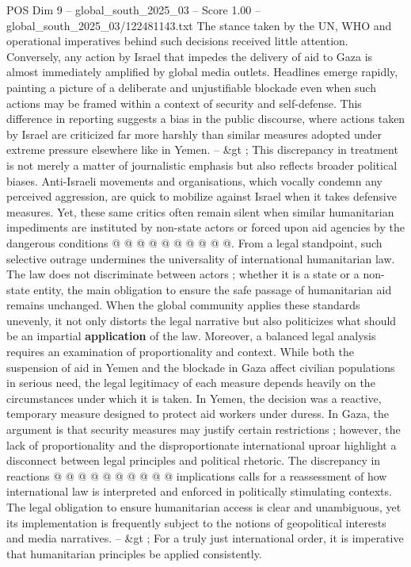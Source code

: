 \begin{textsample}{POS Dim 9 – global\_south\_2025\_03 – Score 1.00 – global\_south\_2025\_03/122481143.txt}
The stance taken by the UN, WHO and operational imperatives behind such decisions received little attention.
Conversely, any action by Israel that impedes the delivery of aid to Gaza is almost immediately amplified by global media outlets.
Headlines emerge rapidly, painting a picture of a deliberate and unjustifiable blockade even when such actions may be framed within a context of security and self-defense.
This difference in reporting suggests a bias in the public discourse, where actions taken by Israel are criticized far more harshly than similar measures adopted under extreme pressure elsewhere like in Yemen. -- \&gt ; This discrepancy in treatment is not merely a matter of journalistic emphasis but also reflects broader political biases.
Anti-Israeli movements and organisations, which vocally condemn any perceived aggression, are quick to mobilize against Israel when it takes defensive measures.
Yet, these same critics often remain silent when similar humanitarian impediments are instituted by non-state actors or forced upon aid agencies by the dangerous conditions @ @ @ @ @ @ @ @ @ @.
From a legal standpoint, such selective outrage undermines the universality of international humanitarian law.
The law does not discriminate between actors ; whether it is a state or a non-state entity, the main obligation to ensure the safe passage of humanitarian aid remains unchanged.
When the global community applies these standards unevenly, it not only distorts the legal narrative but also politicizes what should be an impartial \textbf{application} of the law.
Moreover, a balanced legal analysis requires an examination of proportionality and context.
While both the suspension of aid in Yemen and the blockade in Gaza affect civilian populations in serious need, the legal legitimacy of each measure depends heavily on the circumstances under which it is taken.
In Yemen, the decision was a reactive, temporary measure designed to protect aid workers under duress.
In Gaza, the argument is that security measures may justify certain restrictions ; however, the lack of proportionality and the disproportionate international uproar highlight a disconnect between legal principles and political rhetoric.
The discrepancy in reactions @ @ @ @ @ @ @ @ @ @ implications calls for a reassessment of how international law is interpreted and enforced in politically stimulating contexts.
The legal obligation to ensure humanitarian access is clear and unambiguous, yet its implementation is frequently subject to the notions of geopolitical interests and media narratives. -- \&gt ; For a truly just international order, it is imperative that humanitarian principles be applied consistently.

\end{textsample}
